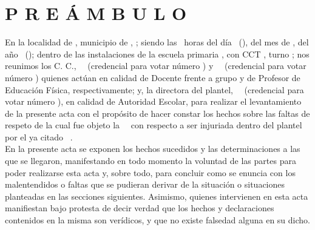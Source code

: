 \section*{P R E Á M B U L O} %
En la localidad de \localidad,
municipio de \municipio,
\estado;
siendo las \hora\ horas
del día \dia\ 
(\diadia),
del mes de \mes,
del año \anno\ 
(\annoanno);
dentro de las instalaciones
de la escuela primaria \escuela,
con CCT \cct,
turno \turno;
nos reunimos los C. C.,
\cargoa\ \profa\
(credencial para votar número \credenciala)
y \cargob\ \profb\
(credencial para votar número \credencialb)
quienes actúan en calidad de
Docente frente a grupo
y de Profesor de Educación Física,
respectivamente;
y, la directora del plantel,
\cargo\ \director\
(credencial para votar número \credencial),
en calidad de Autoridad Escolar,
para realizar el levantamiento de la presente acta
con el propósito de hacer constar los hechos
sobre las faltas de respeto
de la cual fue objeto la
\cargoa\ \profa\,
con respecto a
ser injuriada dentro del plantel
por el ya citado
\cargob\ \profb.\ \\

En la presente acta se exponen los hechos sucedidos
y las determinaciones a las que se llegaron,
manifestando en todo momento la voluntad de las partes
para poder realizarse esta acta
y, sobre todo,
para concluir
como se enuncia
con los malentendidos o faltas
que se pudieran derivar de la situación o situaciones
planteadas en las secciones siguientes.
Asimismo,
quienes intervienen en esta acta
manifiestan bajo protesta de decir verdad
que los hechos y declaraciones
contenidos en la misma son verídicos,
y que no existe falsedad alguna en su dicho.